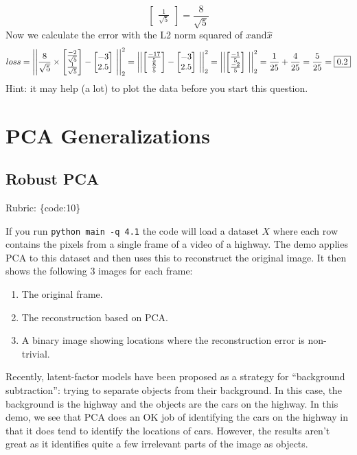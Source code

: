 \documentclass{article}
\def\rubric#1{\gre{Rubric: \{#1\}}}{}
\def\gre#1{{\color{gre}#1}}
\def\enum#1{\begin{enumerate}#1\end{enumerate}}
\begin{document}
{{{\[\begin{bmatrix}
            \frac{1}{\sqrt{5}}
        \end{bmatrix}     
        = \frac{8}{\sqrt{5}}
    \]
    Now we calculate the error with the L2 norm squared of $x \text{and} \hat{x}$
    \[ 
        loss = \left|\left| \frac{8}{\sqrt{5}} \times \begin{bmatrix} \frac{-2}{\sqrt{5}} \\ \frac{1}{\sqrt{5}} \end{bmatrix} - \begin{bmatrix} -3 \\ 2.5 \end{bmatrix} \right|\right|_2^2 = 
        \left|\left| \begin{bmatrix} \frac{-17}{5} \\ \frac{8}{5} \end{bmatrix} - \begin{bmatrix} -3 \\ 2.5 \end{bmatrix} \right|\right|_2^2 = 
        \left|\left| \begin{bmatrix} \frac{-1}{5} \\ \frac{-2}{5}\end{bmatrix} \right|\right|_2^2 = 
        \frac{1}{25} + \frac{4}{25} = \frac{5}{25} = \fbox{0.2}
    \]
}
}
}
Hint: it may help (a lot) to plot the data before you start this question.



\section{PCA Generalizations}

\subsection{Robust PCA}
\rubric{code:10}

If you run \verb|python main -q 4.1| the code will load a dataset $X$ where each row contains the pixels from a single frame of a video of a highway. The demo applies PCA to this dataset and then uses this to reconstruct the original image.
It then shows the following 3 images for each frame:
\enum{
\item The original frame.
\item The reconstruction based on PCA.
\item A binary image showing locations where the reconstruction error is non-trivial.
}
Recently, latent-factor models have been proposed as a strategy for ``background subtraction'': trying to separate objects from their background. In this case, the background is the highway and the objects are the cars on the highway. In this demo, we see that PCA does an OK job of identifying the cars on the highway in that it does tend to identify the locations of cars. However, the results aren't great as it identifies quite a few irrelevant parts of the image as objects.
\end{document}

